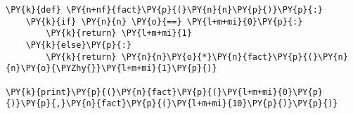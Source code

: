 \begin{Verbatim}[commandchars=\\\{\}]
\PY{k}{def} \PY{n+nf}{fact}\PY{p}{(}\PY{n}{n}\PY{p}{)}\PY{p}{:}
    \PY{k}{if} \PY{n}{n} \PY{o}{==} \PY{l+m+mi}{0}\PY{p}{:}
        \PY{k}{return} \PY{l+m+mi}{1}
    \PY{k}{else}\PY{p}{:}
        \PY{k}{return} \PY{n}{n}\PY{o}{*}\PY{n}{fact}\PY{p}{(}\PY{n}{n}\PY{o}{\PYZhy{}}\PY{l+m+mi}{1}\PY{p}{)}

\PY{k}{print}\PY{p}{(}\PY{n}{fact}\PY{p}{(}\PY{l+m+mi}{0}\PY{p}{)}\PY{p}{,}\PY{n}{fact}\PY{p}{(}\PY{l+m+mi}{10}\PY{p}{)}\PY{p}{)}
\end{Verbatim}
